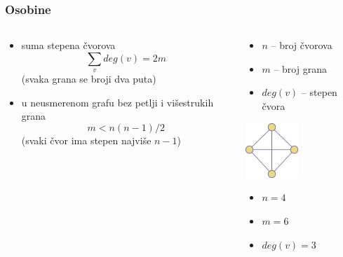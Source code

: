 \documentclass[compress,aspectratio=169]{beamer}
\begin{document}
\begin{frame}[fragile]
  \frametitle{Osobine}
  \begin{columns}
    \begin{column}[t]{7.5cm}
      \begin{itemize}
        \item suma stepena čvorova
        $$\sum_{v}deg(v)=2m$$
        (svaka grana se broji dva puta)
        \item u neusmerenom grafu bez petlji i višestrukih grana
        $$m < n(n-1)/2$$
        (svaki čvor ima stepen najviše $n-1$)
      \end{itemize}
    \end{column}
    \begin{column}[t]{4.5cm}
      \begin{itemize}
        \item $n$ -- broj čvorova
        \item $m$ -- broj grana
        \item $deg(v)$ -- stepen čvora
      \end{itemize}
      \begin{center}
        \includegraphics[width=2cm]{asp-14-pic07.png}
      \end{center}
      \begin{itemize}
        \item $n=4$
        \item $m=6$
        \item $deg(v)=3$
      \end{itemize}
    \end{column}
  \end{columns}
\end{frame}
\end{document}
